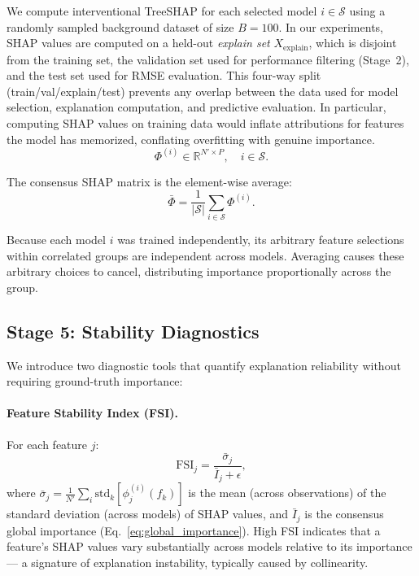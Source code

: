 \documentclass[11pt]{article}
\begin{document}
We compute interventional TreeSHAP \citep{lundberg2020local} for each
selected model $i \in \mathcal{S}$ using a randomly sampled background
dataset of size $B = 100$. In our experiments, SHAP values are computed
on a held-out \emph{explain set} $X_{\text{explain}}$, which is disjoint
from the training set, the validation set used for performance filtering
(Stage~2), and the test set used for RMSE evaluation. This four-way split
(train/val/explain/test) prevents any overlap between the data used for
model selection, explanation computation, and predictive evaluation.
In particular, computing SHAP values on training data would inflate
attributions for features the model has memorized, conflating
overfitting with genuine importance.
\begin{equation}
  \Phi^{(i)} \in \mathbb{R}^{N' \times P}, \quad i \in \mathcal{S}.
\end{equation}

The consensus SHAP matrix is the element-wise average:
\begin{equation}
  \bar{\Phi} = \frac{1}{|\mathcal{S}|} \sum_{i \in \mathcal{S}} \Phi^{(i)}.
  \label{eq:consensus}
\end{equation}

Because each model $i$ was trained independently, its arbitrary feature
selections within correlated groups are independent across models.
Averaging causes these arbitrary choices to cancel, distributing
importance proportionally across the group.

\subsection{Stage 5: Stability Diagnostics}

We introduce two diagnostic tools that quantify explanation reliability
without requiring ground-truth importance:

\paragraph{Feature Stability Index (FSI).}
For each feature $j$:
\begin{equation}
  \text{FSI}_j = \frac{\bar{\sigma}_j}{\bar{I}_j + \epsilon},
  \label{eq:fsi}
\end{equation}
where $\bar{\sigma}_j = \frac{1}{N'}\sum_i \text{std}_k[\phi_j^{(i)}(f_k)]$
is the mean (across observations) of the standard deviation (across models)
of SHAP values, and $\bar{I}_j$ is the consensus global importance
(Eq.~\ref{eq:global_importance}). High FSI indicates that a feature's
SHAP values vary substantially across models relative to its importance---
a signature of explanation instability, typically caused by collinearity.
\end{document}
